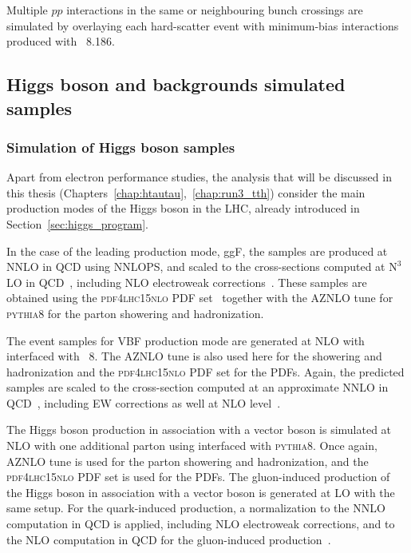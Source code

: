 Multiple $pp$ interactions in the same or neighbouring bunch crossings are simulated by overlaying each hard-scatter event with minimum-bias interactions produced with \pythia~8.186.

\subsection{Higgs boson and backgrounds simulated samples}
\label{subsec:higgs_mc}

\subsubsection*{Simulation of Higgs boson samples}
Apart from electron performance studies, the analysis that will be discussed in this thesis (Chapters~\ref{chap:htautau},~\ref{chap:run3_tth}) consider the main production modes of the Higgs boson in the LHC, already introduced in Section~\ref{sec:higgs_program}. 

In the case of the leading production mode, ggF, the samples are produced at NNLO in QCD using \powheg NNLOPS, and scaled to the cross-sections computed at $\text{N}^{3}$LO in QCD~\cite{PhysRevLett.114.212001,anastasiou2016,Harlander_2009,Harlander,Harlander_2010,Pak_2010}, including NLO electroweak corrections~\cite{Actis_2008,Bonetti_2018}.
These samples are obtained using the \textsc{pdf4lhc15nlo} PDF set~\cite{Butterworth_2016} together with the \textsc{AZNLO} tune for \textsc{pythia8} for the parton showering and hadronization. 

The event samples for VBF production mode are generated at NLO with \powheg interfaced with \pythia~8. The \textsc{AZNLO} tune is also used here for the showering and hadronization and the \textsc{pdf4lhc15nlo} PDF set for the PDFs. Again, the predicted samples are scaled to the cross-section computed at an approximate NNLO in QCD~\cite{Bolzoni_2010}, including EW corrections as well at NLO level~\cite{Ciccolini_2008}.

The Higgs boson production in association with a vector boson is simulated at  NLO with one additional parton using \powheg interfaced with \textsc{pythia8}. Once again, \textsc{AZNLO} tune is used for the parton showering and hadronization,
and the \textsc{pdf4lhc15nlo} PDF set is used for the PDFs. The gluon-induced production of the Higgs boson in association with a vector boson is generated at LO with the same setup. 
For the quark-induced production, a normalization to the NNLO computation in QCD is applied, including NLO electroweak corrections, and to the NLO computation in QCD for the gluon-induced production~\cite{Ciccolini_2003,Denner_2015,Harlander_2014,Altenkamp_2013,Brein_2012, Harlander_2018, Brein_2013}.


